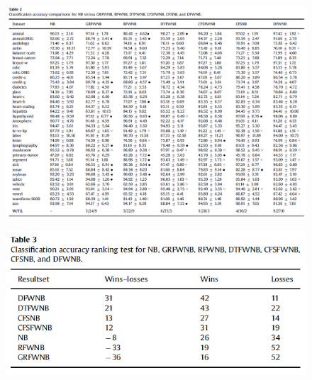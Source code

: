 \documentclass[12pt, a4paper]{article}
\begin{document}
\begin{figure}
    \centering
    \includegraphics[width=\linewidth]{images/article1/table2.png}
    \caption{}
    \label{a1_table2}
\end{figure}
\begin{figure}
    \centering
    \includegraphics[width=\linewidth]{images/article1/table3.png}
    \caption{}
    \label{a1_table3}
\end{figure}

\clearpage
\end{document}
